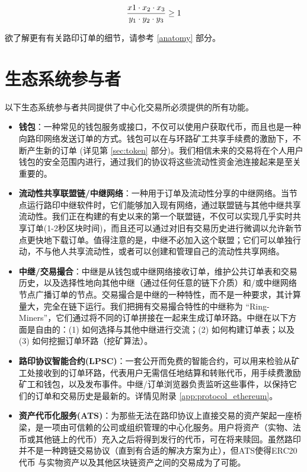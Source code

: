 \documentclass[UTF8]{ctexart}
\begin{document}
\begin{multicols}{2}
\begin{equation}
{{x1 \cdot x_2 \cdot x_3 \over y_1 \cdot y_2 \cdot y_3} \geq 1}
\end{equation}


欲了解更有有关路印订单的细节，请参考 \ref{anatomy} 部分。 



\section{生态系统参与者\label{sec:ecosystem}}
以下生态系统参与者共同提供了中心化交易所必须提供的所有功能。 

\begin{itemize}

\item \textbf{钱包}：一种常见的钱包服务或接口，不仅可以使用户获取代币，而且也是一种向路印网络发送订单的方式。钱包可以在与环路矿工共享手续费的激励下，不断产生新的订单 (详见第 \ref{sec:token} 部分)。我们相信未来的交易将在个人用户钱包的安全范围内进行，通过我们的协议将这些流动性资金池连接起来是至关重要的。

\item \textbf{流动性共享联盟链/中继网络}：一种用于订单及流动性分享的中继网络。当节点运行路印中继软件时，它们能够加入现有网络，通过联盟链与其他中继共享流动性。我们正在构建的有史以来的第一个联盟链，不仅可以实现几乎实时共享订单(1-2秒区块时间)，而且还可以通过对旧有交易历史进行微调以允许新节点更快地下载订单。值得注意的是，中继不必加入这个联盟；它们可以单独行动，不与他人共享流动性，或者可以创建和管理自己的流动性共享网络。

\item \textbf{中继/交易撮合}：中继是从钱包或中继网络接收订单，维护公共订单表和交易历史，以及选择性地向其他中继（通过任何任意的链下介质）和/或中继网络节点广播订单的节点。交易撮合是中继的一种特性，而不是一种要求，其计算量大，完全在链下运行。我们把拥有交易撮合特性的中继称为 \enquote{Ring-Miners}，它们通过将不同的订单拼接在一起来生成订单环路。中继在以下方面是自由的：(1) 如何选择与其他中继进行交流；(2) 如何构建订单表；以及 (3) 如何挖掘订单环路（挖矿算法）。

\item \textbf{路印协议智能合约(LPSC)}：一套公开而免费的智能合约，可以用来检验从矿工处接收到的订单环路，代表用户无需信任地结算和转账代币，用手续费激励矿工和钱包，以及发布事件。中继/订单浏览器负责监听这些事件，以保持它们的订单和交易历史是最新的。详情见附录 \ref{app:protocol_ethereum}。 

\item \textbf{资产代币化服务(ATS)}：为那些无法在路印协议上直接交易的资产架起一座桥梁，是一项由可信赖的公司或组织管理的中心化服务。用户将资产（实物、法币或其他链上的代币）充入之后将得到发行的代币，可在将来赎回。虽然路印并不是一种跨链交易协议（直到有合适的解决方案为止），但ATS使得ERC20代币 \cite{ERC20} 与实物资产以及其他区块链资产之间的交易成为了可能。


\end{itemize}
\end{multicols}
\end{document}
